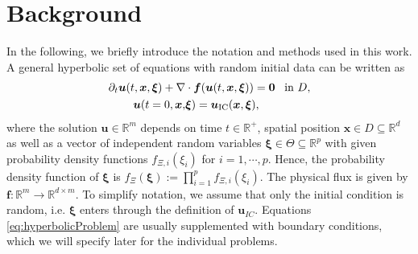\section{Background}
\label{sec:background}
In the following, we briefly introduce the notation and methods used in this work. A general hyperbolic set of equations with random initial data can be written as
\begin{subequations}\label{eq:hyperbolicProblem}
\begin{align}
\label{eq:fulleq}\partial_t \bm{u}(t,\bm{x},\bm{\xi}) + \nabla&\cdot\bm{f}(\bm{u}(t,\bm{x},\bm{\xi})) = \bm{0} \enskip \text{ in } D, \\ \label{eq:ic}
\bm{u}(t=0,\bm{x},&\bm{\xi}) = \bm{u}_{\text{IC}}(\bm{x},\bm{\xi}),
\end{align}
\end{subequations}
where the solution $\bm u\in\mathbb{R}^m$ depends on time $t\in\mathbb{R}^+$, spatial position $\bm{x}\in D\subseteq \mathbb{R}^d$ as well as a vector of independent random variables $\bm{\xi}\in\Theta\subseteq\mathbb{R}^p$ with given probability density functions $f_{\Xi,i}(\xi_i)$ for $i = 1,\cdots,p$. Hence, the probability density function of $\bm{\xi}$ is $f_{\Xi}(\bm\xi):=\prod_{i=1}^p f_{\Xi,i}(\xi_i)$. The physical flux is given by $\bm{f}:\mathbb{R}^m\to\mathbb{R}^{d\times m}$. To simplify notation, we assume that only the initial condition is random, i.e. $\bm{\xi}$ enters through the definition of $\bm{u}_{IC}$. Equations \eqref{eq:hyperbolicProblem} are usually supplemented with boundary conditions, which we will specify later for the individual problems.

